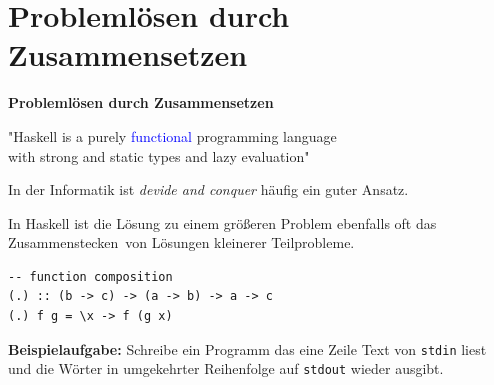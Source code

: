 \documentclass[unknownkeysallowed]{beamer}
\begin{document}
  
\section{Problemlösen durch Zusammensetzen}
\begin{frame}

    \begin{center}
    \Large\textbf{Problemlösen durch Zusammensetzen}
    \end{center}

\end{frame}


\begin{frame}
\begin{center}

  "Haskell is a purely \textcolor{blue}{functional} programming language \\ with strong and static types and lazy evaluation"
  
\end{center}
\end{frame}


\begin{frame}[fragile]

In der Informatik ist \emph{\glqq devide and conquer\grqq} häufig ein guter Ansatz.
 
In Haskell ist die Lösung zu einem größeren Problem ebenfalls oft das \glqq Zusammenstecken\grqq\
von Lösungen kleinerer Teilprobleme.

\pause

\begin{verbatim}
-- function composition
(.) :: (b -> c) -> (a -> b) -> a -> c
(.) f g = \x -> f (g x)
\end{verbatim}

\bigskip
  
\pause 

\textbf{Beispielaufgabe:} Schreibe ein Programm das eine Zeile Text von \texttt{stdin} liest und die  Wörter in umgekehrter Reihenfolge auf \texttt{stdout} wieder ausgibt.

\end{frame} 
\end{document}
